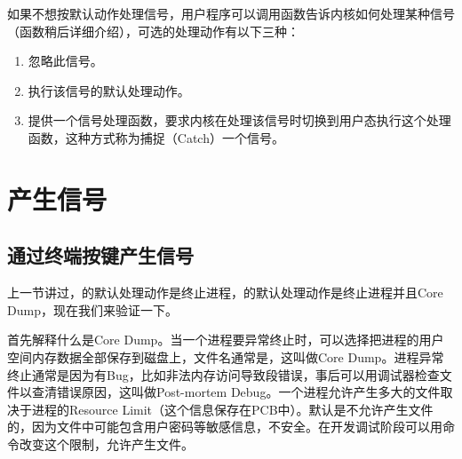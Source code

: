 如果不想按默认动作处理信号，用户程序可以调用函数告诉内核如何处理某种信号（函数稍后详细介绍），可选的处理动作有以下三种：


\begin{enumerate}

\item 忽略此信号。

\item 执行该信号的默认处理动作。

\item 提供一个信号处理函数，要求内核在处理该信号时切换到用户态执行这个处理函数，这种方式称为捕捉（Catch）一个信号。
\end{enumerate}




\section{产生信号}
%
\subsection{通过终端按键产生信号}
%


上一节讲过，的默认处理动作是终止进程，的默认处理动作是终止进程并且Core Dump，现在我们来验证一下。



首先解释什么是Core Dump。当一个进程要异常终止时，可以选择把进程的用户空间内存数据全部保存到磁盘上，文件名通常是，这叫做Core Dump。进程异常终止通常是因为有Bug，比如非法内存访问导致段错误，事后可以用调试器检查文件以查清错误原因，这叫做Post-mortem Debug。一个进程允许产生多大的文件取决于进程的Resource Limit（这个信息保存在PCB中）。默认是不允许产生文件的，因为文件中可能包含用户密码等敏感信息，不安全。在开发调试阶段可以用命令改变这个限制，允许产生文件。



